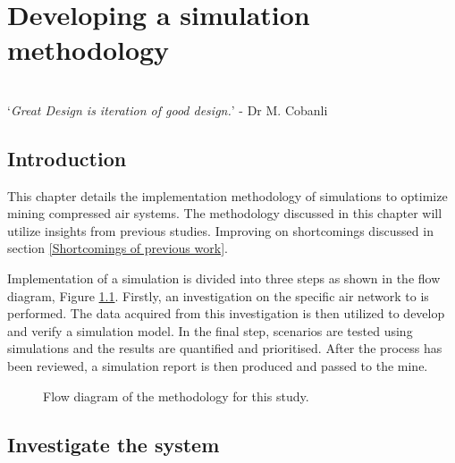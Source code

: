 \chapter{Developing a simulation methodology}
\thispagestyle{empty}
\vspace{38em}
\hrulefill
\\
\enquote*{\textit{Great Design is iteration of good design.}} - Dr M. Cobanli\\
\newpage
\section{Introduction}
This chapter details the implementation methodology of simulations to optimize mining compressed air systems. The methodology discussed in this chapter will utilize insights from previous studies. Improving on shortcomings discussed in section \ref{Shortcomings of previous work}.
\par 
Implementation of a simulation is divided into three steps as shown in the flow diagram, Figure \ref{fig: Methodology}. Firstly, an investigation on the specific air network to is performed. The data acquired from this investigation is then utilized to develop and verify a simulation model. In the final step, scenarios are tested using simulations and the results are quantified and prioritised. After the process has been reviewed, a simulation  report is then produced and passed to the mine.
\begin{figure}[h]
	\centering
	\caption{Flow diagram of the methodology for this study.}
	\label{fig: Methodology}
\end{figure}
\newpage
\section{Investigate the system}
